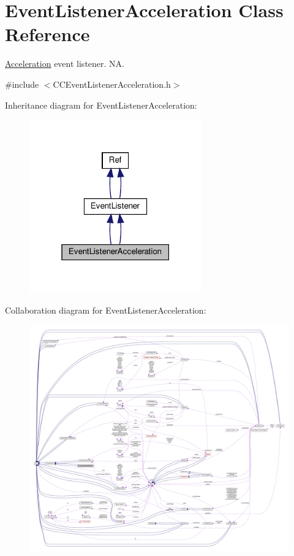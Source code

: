 \hypertarget{classEventListenerAcceleration}{}\section{Event\+Listener\+Acceleration Class Reference}
\label{classEventListenerAcceleration}


\hyperlink{classAcceleration}{Acceleration} event listener.  NA.  




{\ttfamily \#include $<$C\+C\+Event\+Listener\+Acceleration.\+h$>$}



Inheritance diagram for Event\+Listener\+Acceleration\+:
\nopagebreak
\begin{figure}[H]
\begin{center}
\leavevmode
\includegraphics[width=211pt]{classEventListenerAcceleration__inherit__graph}
\end{center}
\end{figure}


Collaboration diagram for Event\+Listener\+Acceleration\+:
\nopagebreak
\begin{figure}[H]
\begin{center}
\leavevmode
\includegraphics[width=350pt]{classEventListenerAcceleration__coll__graph}
\end{center}
\end{figure}
